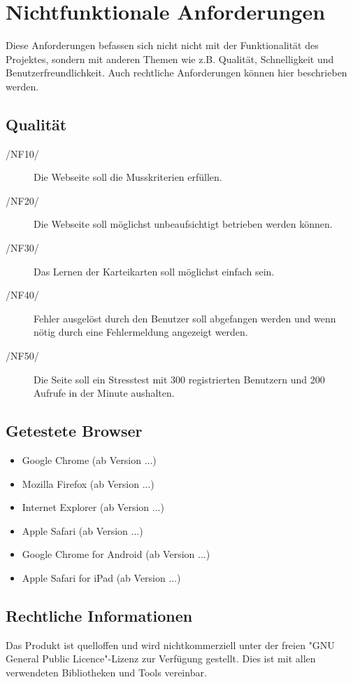 \section{Nichtfunktionale Anforderungen}
Diese Anforderungen befassen sich nicht nicht mit der Funktionalität des Projektes, sondern mit anderen Themen wie z.B. Qualität, Schnelligkeit und Benutzerfreundlichkeit. Auch rechtliche Anforderungen können hier beschrieben werden.

\subsection{Qualität}
\begin{description}
     \item[/NF10/] Die Webseite soll die Musskriterien erfüllen.
     \item[/NF20/] Die Webseite soll möglichst unbeaufsichtigt betrieben werden können.
     \item[/NF30/] Das Lernen der Karteikarten soll möglichst einfach sein.
     \item[/NF40/] Fehler ausgelöst durch den Benutzer soll abgefangen werden und wenn nötig durch eine Fehlermeldung angezeigt werden.
     \item[/NF50/] Die Seite soll ein Stresstest mit 300 registrierten Benutzern und 200 Aufrufe in der Minute aushalten.
\end{description}

\subsection{Getestete Browser}
\begin{itemize}
	\item Google Chrome (ab Version ...)
	\item Mozilla Firefox (ab Version ...)
	\item Internet Explorer (ab Version ...)
	\item Apple Safari (ab Version ...)
	\item Google Chrome for Android (ab Version ...)
	\item Apple Safari for iPad (ab Version ...)
\end{itemize}

\subsection{Rechtliche Informationen}
Das Produkt ist quelloffen und wird nichtkommerziell unter der freien "GNU General Public Licence"-Lizenz zur Verfügung gestellt. Dies ist mit allen verwendeten Bibliotheken und Tools vereinbar.
